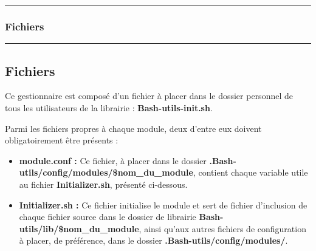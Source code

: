 \documentclass[a4paper,10pt]{article}
\begin{document}
\begin{justify}

\end{justify}


\color{sec3}\par\noindent\rule{\textwidth}{0.4pt}\color{text}

\color{sec3}
\subsubsection{Fichiers}\color{text}

\begin{justify}

\end{justify}




\color{sec2}\par\noindent\rule{\textwidth}{0.4pt}\color{text}

\color{sec2}
\subsection{Fichiers}\color{text}

\begin{justify}
    Ce gestionnaire est composé d'un fichier à placer dans le dossier personnel de tous les utilisateurs de la librairie :  \textbf{\color{path}Bash-utils-init.sh}.
\end{justify}

\begin{justify}
    Parmi les fichiers propres à chaque module, deux d'entre eux doivent obligatoirement être présents :

    \begin{itemize}
        \item \textbf{\color{path}module.conf\color{text} :} Ce fichier, à placer dans le dossier \textbf{\color{path}.Bash-utils/config/modules/\$nom\_du\_module}, contient chaque variable utile au fichier \textbf{\color{path}Initializer.sh}, présenté ci-dessous.\\\mbox{}

        \item \textbf{\color{path}Initializer.sh\color{text} :} Ce fichier initialise le module et sert de fichier d'inclusion de chaque fichier source dans le dossier de librairie \textbf{\color{path}Bash-utils/lib/\$nom\_du\_module}, ainsi qu'aux autres fichiers de configuration à placer, de préférence, dans le dossier \textbf{\color{path}.Bash-utils/config/modules/}.
    \end{itemize}
\end{justify}
\end{document}
